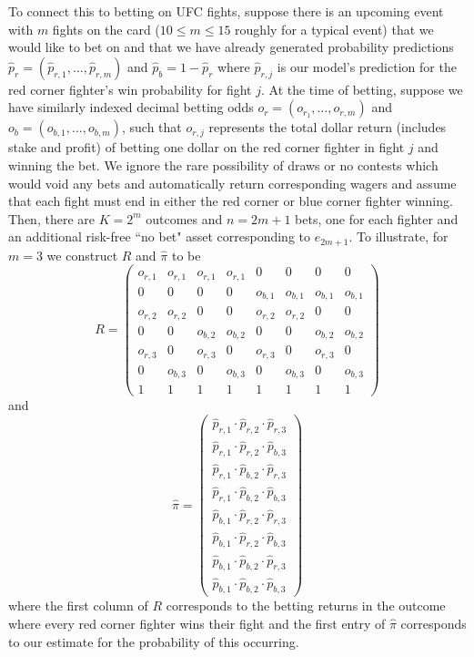 \documentclass[12pt,twoside]{report}
\begin{document}
To connect this to betting on UFC fights, suppose there is an upcoming event with $m$ fights on the card ($10 \leq m \leq 15$ roughly for a typical event) that we would like to bet on and that we have already generated probability predictions $\hat{p}_r = (\hat{p}_{r, 1}, \ldots, \hat{p}_{r, m})$ and $\hat{p}_b = 1 - \hat{p}_r$ where $\hat{p}_{r,j}$ is our model's prediction for the red corner fighter's win probability for fight $j$. At the time of betting, suppose we have similarly indexed decimal betting odds $o_r = (o_{r_1}, \ldots, o_{r, m})$ and $o_b = (o_{b, 1}, \ldots, o_{b, m})$, such that $o_{r, j}$ represents the total dollar return (includes stake and profit) of betting one dollar on the red corner fighter in fight $j$ and winning the bet. We ignore the rare possibility of draws or no contests which would void any bets and automatically return corresponding wagers and assume that each fight must end in either the red corner or blue corner fighter winning. Then, there are $K = 2^m$ outcomes and $n = 2m + 1$ bets, one for each fighter and an additional risk-free ``no bet" asset corresponding to $e_{2m + 1}$. To illustrate, for $m = 3$ we construct $R$ and $\hat{\pi}$ to be
$$R = \begin{pmatrix}
    o_{r, 1} & o_{r, 1} & o_{r, 1} & o_{r, 1} & 0 & 0 & 0 & 0 \\
    0 & 0 & 0 & 0 & o_{b, 1} & o_{b, 1} & o_{b, 1} & o_{b, 1} \\
    o_{r, 2} & o_{r, 2} & 0 & 0 & o_{r, 2} & o_{r, 2} & 0 & 0 \\
    0 & 0 & o_{b, 2} & o_{b, 2} & 0 & 0 & o_{b, 2} & o_{b, 2} \\
    o_{r, 3} & 0 & o_{r, 3} & 0 & o_{r, 3} & 0 & o_{r, 3} & 0 \\
    0 & o_{b, 3} & 0 & o_{b, 3} & 0 & o_{b, 3} & 0 & o_{b, 3} \\ 
    1 & 1 & 1 & 1 & 1 & 1 & 1 & 1
\end{pmatrix}$$
and 
$$\hat{\pi} = \begin{pmatrix}
    \hat{p}_{r, 1} \cdot \hat{p}_{r, 2} \cdot \hat{p}_{r, 3} \\
    \hat{p}_{r, 1} \cdot \hat{p}_{r, 2} \cdot \hat{p}_{b, 3} \\
    \hat{p}_{r, 1} \cdot \hat{p}_{b, 2} \cdot \hat{p}_{r, 3} \\
    \hat{p}_{r, 1} \cdot \hat{p}_{b, 2} \cdot \hat{p}_{b, 3} \\
    \hat{p}_{b, 1} \cdot \hat{p}_{r, 2} \cdot \hat{p}_{r, 3} \\
    \hat{p}_{b, 1} \cdot \hat{p}_{r, 2} \cdot \hat{p}_{b, 3} \\
    \hat{p}_{b, 1} \cdot \hat{p}_{b, 2} \cdot \hat{p}_{r, 3} \\ 
    \hat{p}_{b, 1} \cdot \hat{p}_{b, 2} \cdot \hat{p}_{b, 3}
\end{pmatrix}$$
where the first column of $R$ corresponds to the betting returns in the outcome where every red corner fighter wins their fight and the first entry of $\hat{\pi}$ corresponds to our estimate for the probability of this occurring.
\end{document}
